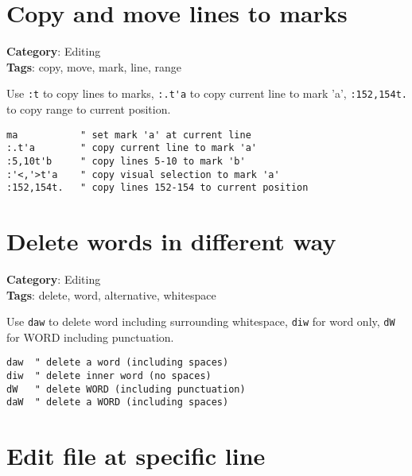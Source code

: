 {{{{\section{Copy and move lines to marks}

\textbf{Category}: Editing\\ \textbf{Tags}: copy, move, mark, line, range
\vspace{0.5cm}

Use {\footnotesize \Verb§:t§} to copy lines to marks, {\footnotesize \Verb§:.t'a§} to copy current line to mark 'a', {\footnotesize \Verb§:152,154t.§} to copy range to current position.

\begin{Exa*}{}
\begin{Verbatim}[fontsize=\footnotesize, breaklines, breakanywhere]
ma           " set mark 'a' at current line
:.t'a        " copy current line to mark 'a'
:5,10t'b     " copy lines 5-10 to mark 'b'
:'<,'>t'a    " copy visual selection to mark 'a'
:152,154t.   " copy lines 152-154 to current position
\end{Verbatim}
\end{Exa*}

\section{Delete words in different way}

\textbf{Category}: Editing\\ \textbf{Tags}: delete, word, alternative, whitespace
\vspace{0.5cm}

Use {\footnotesize \Verb§daw§} to delete word including surrounding whitespace, {\footnotesize \Verb§diw§} for word only, {\footnotesize \Verb§dW§} for WORD including punctuation.

\begin{Exa*}{}
\begin{Verbatim}[fontsize=\footnotesize, breaklines, breakanywhere]
daw  " delete a word (including spaces)
diw  " delete inner word (no spaces)
dW   " delete WORD (including punctuation)
daW  " delete a WORD (including spaces)
\end{Verbatim}
\end{Exa*}

\section{Edit file at specific line}

}}}}
